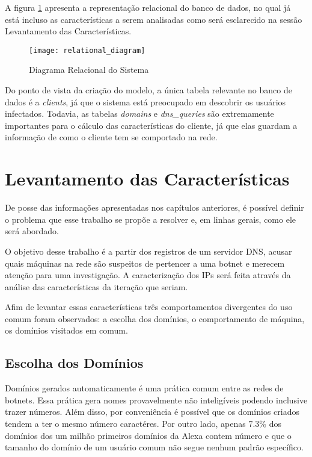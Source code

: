 A figura \ref{fig:relational_diagram} apresenta a representação relacional do banco de dados, no qual já está incluso as características a serem analisadas como será esclarecido na sessão Levantamento das Características.

\begin{figure}
\texttt{[image: relational\_diagram]}
\caption[Diagrama Relacional do Sistema]{Diagrama Relacional do Sistema} \label{fig:relational_diagram}
\end{figure}

Do ponto de vista da criação do modelo, a única tabela relevante no banco de dados é a \textit{clients}, já que o sistema está preocupado em descobrir os usuários infectados. Todavia, as tabelas \textit{domains} e \textit{dns_queries} são extremamente importantes para o cálculo das características do cliente, já que elas guardam a informação de como o cliente tem se comportado na rede.

\section{Levantamento das Características}
De posse das informações apresentadas nos capítulos anteriores, é possível definir o problema que esse trabalho se propõe a resolver e, em linhas gerais, como ele será abordado.

O objetivo desse trabalho é a partir dos registros de um servidor DNS, acusar quais máquinas na rede são suspeitos de pertencer a uma botnet e merecem atenção para uma investigação. A caracterização dos IPs será feita através da análise das características da iteração que seriam.

Afim de levantar essas características três comportamentos divergentes do uso comum foram observados: a escolha dos domínios, o comportamento de máquina, os domínios visitados em comum.

\subsection{Escolha dos Domínios}
Domínios gerados automaticamente é uma prática comum entre as redes de botnets. Essa prática gera nomes provavelmente não inteligíveis podendo inclusive trazer números. Além disso, por conveniência é possível que os domínios criados tendem a ter o mesmo número caractéres. Por outro lado, apenas 7.3\% dos domínios dos um milhão primeiros domínios da Alexa contem número e que o tamanho do domínio de um usuário comum não segue nenhum padrão específico.

